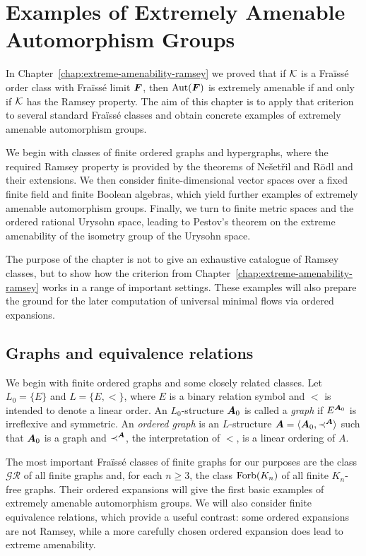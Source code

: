 \chapter[Examples of Extreme Amenability]{Examples of Extremely Amenable Automorphism Groups}
\label{chap:examples-extreme-amenability}
In Chapter~\ref{chap:extreme-amenability-ramsey} we proved that if \(\mathcal{K}\) is a Fraïssé order class with Fraïssé limit \(\boldsymbol{F}\), then \(\operatorname{Aut}(\boldsymbol{F})\) is extremely amenable if and only if \(\mathcal{K}\) has the Ramsey property. The aim of this chapter is to apply that criterion to several standard Fraïssé classes and obtain concrete examples of extremely amenable automorphism groups.

We begin with classes of finite ordered graphs and hypergraphs, where the required Ramsey property is provided by the theorems of Ne\v{s}et\v{r}il and R\"odl and their extensions. We then consider finite-dimensional vector spaces over a fixed finite field and finite Boolean algebras, which yield further examples of extremely amenable automorphism groups. Finally, we turn to finite metric spaces and the ordered rational Urysohn space, leading to Pestov's theorem on the extreme amenability of the isometry group of the Urysohn space.

The purpose of the chapter is not to give an exhaustive catalogue of Ramsey classes, but to show how the criterion from Chapter~\ref{chap:extreme-amenability-ramsey} works in a range of important settings. These examples will also prepare the ground for the later computation of universal minimal flows via ordered expansions.

\section{Graphs and equivalence relations}

We begin with finite ordered graphs and some closely related classes. Let \(L_0=\{E\}\) and \(L=\{E,<\}\), where \(E\) is a binary relation symbol and \(<\) is intended to denote a linear order. An \(L_0\)-structure \(\boldsymbol{A}_0\) is called a \emph{graph} if \(E^{\boldsymbol{A}_0}\) is irreflexive and symmetric. An \emph{ordered graph} is an \(L\)-structure \(\boldsymbol{A}=\langle \boldsymbol{A}_0,\prec^{\boldsymbol{A}}\rangle\) such that \(\boldsymbol{A}_0\) is a graph and \(\prec^{\boldsymbol{A}}\), the interpretation of \(<\), is a linear ordering of \(A\).

The most important Fraïssé classes of finite graphs for our purposes are the class \(\mathcal{GR}\) of all finite graphs and, for each \(n\geq 3\), the class \(\operatorname{Forb}(K_n)\) of all finite \(K_n\)-free graphs. Their ordered expansions will give the first basic examples of extremely amenable automorphism groups. We will also consider finite equivalence relations, which provide a useful contrast: some ordered expansions are not Ramsey, while a more carefully chosen ordered expansion does lead to extreme amenability.

